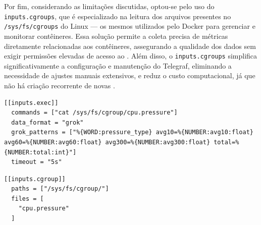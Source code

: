 Por fim, considerando as limitações discutidas, optou-se pelo uso do  \verb|inputs.cgroups|, que é especializado na leitura dos arquivos presentes no  \verb|/sys/fs/cgroups| do Linux --- os mesmos utilizados pelo Docker para gerenciar e monitorar contêineres. Essa solução permite a coleta precisa de métricas diretamente relacionadas aos contêineres, assegurando a qualidade dos dados sem exigir permissões elevadas de acesso ao . Além disso, o \verb|inputs.cgroups| simplifica significativamente a configuração e manutenção do Telegraf, eliminando a necessidade de ajustes manuais extensivos, e reduz o custo computacional, já que não há criação recorrente de novas .


\begin{lstlisting}[caption={Leitura da métrica "cpu.pressure" com inputs.exec}, label={lst:trecho1}]
[[inputs.exec]]
  commands = ["cat /sys/fs/cgroup/cpu.pressure"]
  data_format = "grok"
  grok_patterns = ["%{WORD:pressure_type} avg10=%{NUMBER:avg10:float} avg60=%{NUMBER:avg60:float} avg300=%{NUMBER:avg300:float} total=%{NUMBER:total:int}"]
  timeout = "5s"
\end{lstlisting}

\begin{lstlisting}[caption={Leitura da mesma métrica "cpu.pressure" com inputs.cgroups}, label={lst:trecho2}]
[[inputs.cgroup]]
  paths = ["/sys/fs/cgroup/"]
  files = [
    "cpu.pressure"
  ]
\end{lstlisting}



